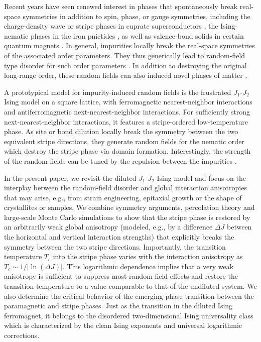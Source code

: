 \documentclass[twocolumn,showpacs,superscriptaddress,aps,prb]{revtex4-2}
\begin{document}
Recent years have seen renewed interest in phases that spontaneously break real-space
symmetries in addition to spin, phase, or gauge symmetries, including the charge-density wave or
stripe phases in cuprate superconductors \cite{EmeryKivelsonTranquada99,KBFOTKH03,VojtaM09},
the Ising-nematic phases in the iron
pnictides \cite{FKLEM10,FernandesChubukovSchmalian14,FradkinKivelsonTranquada15},
as well as valence-bond solids in certain quantum magnets
\cite{ReadSachdev89,MambriniLauchliPoilblancMila06,Sandvik07}. In general, impurities locally
break the real-space symmetries of the associated order parameters. They thus generically lead
to random-field type disorder for such order parameters
\cite{Fernandez88,FyodorovShender91,CDFK06,LohCarlsonDahmen10,NieTarjusKivelson14,KunwarSenVojtaNarayanan18,AndradeHoyosRachelVojta18,Mirandaetal21}.
In addition to destroying the original long-range order, these random fields can also induced novel
phases of matter \cite{AndradeHoyosRachelVojta18,Mirandaetal21}.

A prototypical model for impurity-induced random fields is the frustrated $J_1$-$J_2$ Ising model on a
square lattice, with ferromagnetic nearest-neighbor interactions and antiferromagnetic
next-nearest-neighbor interactions. For sufficiently strong next-nearest-neighbor interactions,
it features a stripe-ordered low-temperature phase. As site or bond dilution locally break
the symmetry between the two equivalent stripe directions, they generate random fields
for the nematic order \cite{Fernandez88,KunwarSenVojtaNarayanan18} which destroy the
stripe phase via domain formation. Interestingly, the strength of the random fields can
be tuned by the repulsion between the impurities \cite{KunwarSenVojtaNarayanan18}.

In the present paper, we revisit the diluted $J_1$-$J_2$ Ising model and focus on the
interplay between the random-field  disorder and global interaction anisotropies that may arise,
e.g., from strain engineering, epitaxial growth or the shape of crystallites or samples.
We combine symmetry arguments, percolation theory and large-scale Monte Carlo simulations
to show that the stripe phase is restored by an arbitrarily weak global anisotropy
(modeled, e.g., by a difference $\Delta J$ between the horizontal and vertical interaction strengths)
that explicitly breaks the symmetry between the two stripe directions. Importantly,
the transition temperature $T_c$ into the stripe phase varies with the interaction
anisotropy as $T_c \sim 1/|\ln(\Delta J)|$. This logarithmic dependence
implies that a very weak anisotropy is sufficient to suppress most random-field effects
and restore the transition temperature to a value comparable to that of the undiluted system.
We also determine the critical behavior of the emerging phase transition between the paramagnetic
and stripe phases.
Just as the transition in the diluted Ising ferromagnet, it belongs to the disordered
two-dimensional Ising universality class which is characterized by the clean Ising
exponents and universal logarithmic corrections.
\end{document}
